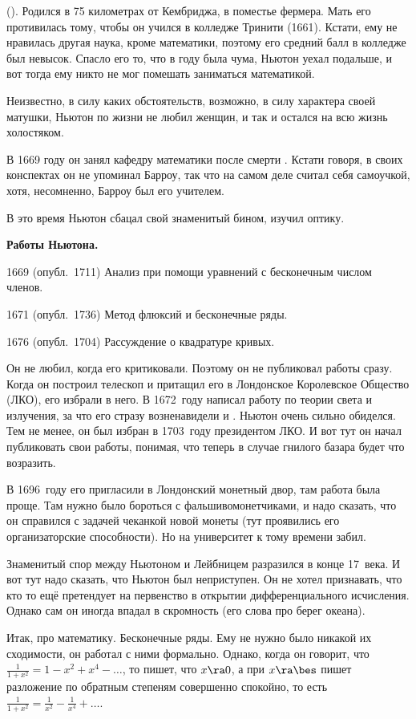 \documentclass[a4paper,oneside,fleqn,10pt]{article}
\begin{document}
 (). Родился в 75
километрах от Кембриджа, в поместье фермера. Мать его противилась
тому, чтобы он учился в колледже Тринити (1661).  Кстати, ему не
нравилась другая наука, кроме математики, поэтому его средний балл в
колледже был невысок.  Спасло его то, что в  году была
чума, Ньютон уехал подальше, и вот тогда ему никто не мог помешать
заниматься математикой.

Неизвестно, в силу каких обстоятельств, возможно, в силу характера
своей матушки, Ньютон по жизни не любил женщин, и так и остался на всю
жизнь холостяком.

В 1669 году он занял кафедру математики после смерти .
Кстати говоря, в своих конспектах он не упоминал Барроу, так что на
самом деле считал себя самоучкой, хотя, несомненно, Барроу был его
учителем.

В это время Ньютон сбацал свой знаменитый бином, изучил оптику.


\textbf{Работы Ньютона.}

1669 (опубл.~1711) Анализ при помощи уравнений с бесконечным числом
членов.

1671 (опубл.~1736) Метод флюксий и бесконечные ряды.

1676 (опубл.~1704) Рассуждение о квадратуре кривых.

Он не любил, когда его критиковали. Поэтому он не публиковал работы
сразу.  Когда он построил телескоп и притащил его в Лондонское
Королевское Общество (ЛКО), его избрали в него.  В 1672~году написал
работу по теории света и излучения, за что его стразу возненавидели
 и .  Ньютон очень сильно обиделся. Тем не
менее, он был избран в 1703~году президентом ЛКО. И вот тут он начал
публиковать свои работы, понимая, что теперь в случае гнилого базара
будет что возразить.

В 1696~году его пригласили в Лондонский монетный двор, там работа была
проще.  Там нужно было бороться с фальшивомонетчиками, и надо сказать,
что он справился с задачей чеканкой новой монеты (тут проявились его
организаторские способности).  Но на университет к тому времени забил.

Знаменитый спор между Ньютоном и Лейбницем разразился в конце 17~века.
И вот тут надо сказать, что Ньютон был неприступен. Он не хотел
признавать, что кто то ещё претендует на первенство в открытии
дифференциального исчисления.  Однако сам он иногда впадал в
скромность (его слова про берег океана).

Итак, про математику. Бесконечные ряды. Ему не нужно было никакой их
сходимости, он работал с ними формально. Однако, когда он говорит, что
$\frac{1}{1+x^2} = 1 - x^2 + x^4-\dots$, то пишет, что $x \ra 0$, а
при $x \ra \bes$ пишет разложение по обратным степеням совершенно
спокойно, то есть $\frac{1}{1+x^2} = \frac{1}{x^2} - \frac{1}{x^4} +
\dots$.
\end{document}
